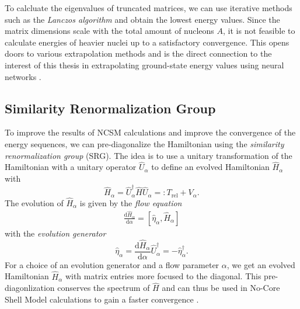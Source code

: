 To calcluate the eigenvalues of truncated matrices, we can use iterative methods such as the \textit{Lanczos algorithm} and obtain the lowest energy values. Since the matrix dimensions scale with the total amount of nucleons $A$, it is not feasible to calculate energies of heavier nuclei up to a satisfactory convergence. This opens doors to various extrapolation methods and is the direct connection to the interest of this thesis in extrapolating ground-state energy values using neural networks \cite{sommerschule,ringschuck}.

\subsection{Similarity Renormalization Group}
To improve the results of NCSM calculations and improve the convergence of the energy sequences, we can pre-diagonalize the Hamiltonian using the \textit{similarity renormalization group} (SRG). The idea is to use a unitary transformation of the Hamiltonian with a unitary operator $\hat{U}_\alpha$ to define an evolved Hamiltonian $\hat{H}_\alpha$ with
\begin{equation}
  \hat{H}_\alpha = \hat{U}_\alpha^\dagger \hat{H} \hat{U}_\alpha =: T_\mathrm{rel} + V_\alpha.
\end{equation}
The evolution of $\hat{H}_\alpha$ is given by the \textit{flow equation}
\begin{align}
  \frac{\mathrm{d}\hat{H}_\alpha}{\mathrm{d}\alpha} = [\hat{\eta}_\alpha, \hat{H}_\alpha]
\end{align}
with the \textit{evolution generator}
\begin{equation}
  \hat{\eta}_\alpha = \frac{\mathrm{d}\hat{H}_\alpha}{\mathrm{d}\alpha} \hat{U}^\dagger_\alpha = -\hat{\eta}_\alpha^\dagger.
\end{equation}
For a choice of an evolution generator and a flow parameter $\alpha$, we get an evolved Hamiltonian $\hat{H}_\alpha$ with matrix entries more focused to the diagonal. This pre-diagonlization conserves the spectrum of $\hat{H}$ and can thus be used in No-Core Shell Model calculations to gain a faster convergence \cite{sommerschule}.
